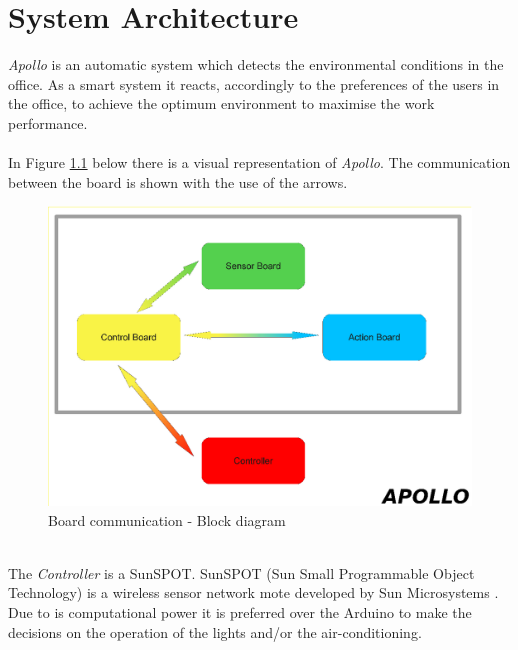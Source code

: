 \documentclass[12pt,a4paper]{report}
\begin{document}
\chapter{System Architecture}
%
\emph{Apollo} is an automatic system which detects the environmental conditions in the office. As a smart system it reacts, accordingly to the preferences of the users in the office, to achieve the optimum environment to maximise the work performance.\\
\ \\
In Figure \ref{arch_design} below there is a visual representation of \emph{Apollo}. The communication between the board is shown with the use of the arrows.\\
%
\begin{figure}[H]
\centering
\includegraphics*[scale=0.35]{architecture_design}
\caption{Board communication - Block diagram}
\label{arch_design}
\end{figure}
\ \\
The \textit{Controller} is a SunSPOT. SunSPOT (Sun Small Programmable Object Technology) is a wireless sensor network mote developed by Sun Microsystems \cite{website:sunspot}. Due to is computational power it is preferred over the Arduino to make the decisions on the operation of the lights and/or the air-conditioning.\label{Controller} \\ 
\ \\
\end{document}
